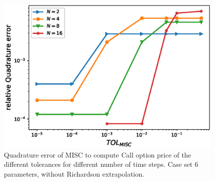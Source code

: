 \documentclass[11pt]{article}
\begin{document}
\begin{figure}[h!]
	\centering
	\includegraphics[width=0.7\linewidth]{./figures/rBergomi_MISC_quadratre_error/vs_TOL/set6/relative_quad_error_wrt_MISC_TOL_set6_non_rich}
	
	
	\caption{Quadrature error of MISC to compute Call option price of the different tolerances for different number of time steps. Case  set $6$ parameters, without Richardson extrapolation.}
	\label{fig:Quadrature_error_set6}
\end{figure}
\end{document}
